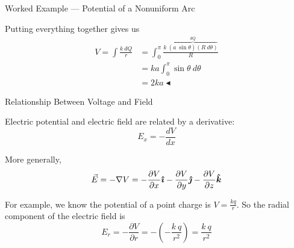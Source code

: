 \documentclass{beamer}
\begin{document}
\begin{frame}{Worked Example --- Potential of a Nonuniform Arc}

Putting everything together gives us
\begin{align*}
    V = \int \frac{k\ dQ}{r} &= \int_{0}^{\pi} \frac{k\ \overbrace{\left( a\ \sin{\theta} \right)  \left( R\ d\theta \right)}^{dQ}}{R} \\[1em]
                             &= ka \int_{0}^{\pi} \sin{\theta}\ d\theta \\[1em]
                             &= \boxed{2ka} \blacktriangleleft
\end{align*}

\end{frame}

\begin{frame}{Relationship Between Voltage and Field}

Electric potential and electric field are related by a derivative:
\begin{equation*}
    E_x = -\frac{dV}{dx}
\end{equation*}

More generally,
\begin{equation*}
    \vec{E} = -\nabla V = -\frac{\partial V}{\partial x}\bm{\hat{\imath}} - \frac{\partial V}{\partial y}\bm{\hat{\jmath}} - \frac{\partial V}{\partial z} \bm{\hat{k}}
\end{equation*}

For example, we know the potential of a point charge is $V = \frac{k q}{r}$. So the radial component of the electric field is
\begin{equation*}
    E_r = -\frac{\partial V}{\partial r} = - \left( - \frac{k\ q}{r^2} \right) = \frac{k\ q}{r^2}
\end{equation*}

\end{frame}
\end{document}

